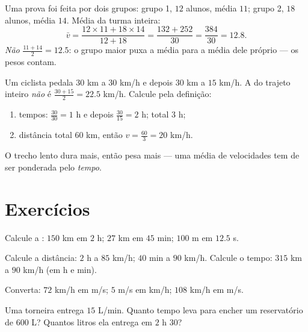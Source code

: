 \begin{example}\label{ex:g8:speed:average}
Uma prova foi feita por dois grupos: grupo 1, $12$ alunos, média $11$;
grupo 2, $18$ alunos, média $14$. Média da turma inteira:
\[
\bar v = \frac{12 \times 11 + 18 \times 14}{12 + 18}
= \frac{132 + 252}{30} = \frac{384}{30} = 12.8 .
\]
\emph{Não} $\frac{11 + 14}{2} = 12.5$: o grupo maior puxa a média para
a média dele próprio --- os pesos contam.
\end{example}

\begin{example}\label{ex:g8:speed:twolegs}
Um ciclista pedala $30$ km a $30$ km/h e depois $30$ km a $15$ km/h. A
 do trajeto inteiro \emph{não} é
$\frac{30 + 15}{2} = 22.5$ km/h. Calcule pela definição:
\begin{enumerate}
  \item tempos: $\frac{30}{30} = 1$ h e depois $\frac{30}{15} = 2$ h;
        total $3$ h;
  \item distância total $60$ km, então $v = \frac{60}{3} = 20$ km/h.
\end{enumerate}
O trecho lento dura mais, então pesa mais --- uma média de velocidades
tem de ser ponderada pelo \emph{tempo}.
\end{example}

\section{Exercícios}

\begin{exercise}[$\star$]\label{exo:g8:speed:1}
Calcule a : $150$ km em $2$ h; $27$ km em $45$ min;
$100$ m em $12.5$ s.
\end{exercise}

\begin{exercise}[$\star$]\label{exo:g8:speed:2}
Calcule a distância: $2$ h a $85$ km/h; $40$ min a $90$ km/h. Calcule
o tempo: $315$ km a $90$ km/h (em h e min).
\end{exercise}

\begin{exercise}[$\star$]\label{exo:g8:speed:3}
Converta: $72$ km/h em m/s; $5$ m/s em km/h; $108$ km/h em m/s.
\end{exercise}

\begin{exercise}[$\star$]\label{exo:g8:speed:4}
Uma torneira entrega $15$ L/min. Quanto tempo leva para encher um
reservatório de $600$ L? Quantos litros ela entrega em $2$ h $30$?
\end{exercise}

